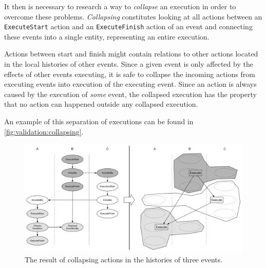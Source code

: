 	
	\newpar It then is necessary to research a way to \textit{collapse} an execution in order to overcome these problems. \textit{Collapsing} constitutes looking at all actions between an \texttt{ExecuteStart} action and an \texttt{ExecuteFinish} action of an event and connecting these events into a single entity, representing an entire execution. 
	
	Actions between start and finish might contain relations to other actions located in the local histories of other events. Since a given event is only affected by the effects of other events executing, it is safe to collapse the incoming actions from executing events into execution of the executing event. Since an action is always caused by the execution of \textit{some} event, the collapsed execution has the property that no action can happened outside any collapsed execution.
	
	An example of this separation of executions can be found in \autoref{fig:validation:collapsing}.
	
	\begin{figure}[H]
		\centering
		\includegraphics[width=\textwidth]{6orderofexecution/images/transitive-example-collapse.pdf}
		\caption{The result of collapsing actions in the histories of three events.}
		\label{fig:validation:collapsing}
	\end{figure}
	
